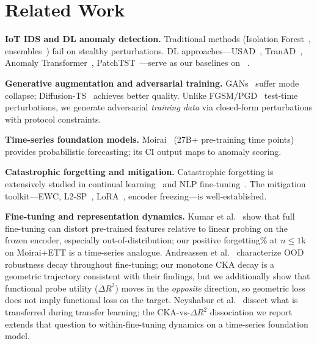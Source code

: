 \section{Related Work}
\label{sec:related}

\textbf{IoT IDS and DL anomaly detection.}
Traditional methods (Isolation Forest~\cite{liu2012isolation},
ensembles~\cite{garcia2014empirical}) fail on stealthy perturbations.
DL approaches---USAD~\cite{audibert2020usad},
TranAD~\cite{tuli2022tranad}, Anomaly
Transformer~\cite{xu2022anomaly}, PatchTST~\cite{nie2023patchtst}---serve
as our baselines on \dataset{}~\cite{neto2023ciciot}.

\textbf{Generative augmentation and adversarial training.}
GANs~\cite{lin2022idsgan} suffer mode collapse;
Diffusion-TS~\cite{zhang2024diffusionts} achieves better quality.
Unlike FGSM/PGD~\cite{goodfellow2015adversarial, madry2018pgd}
test-time perturbations, we generate adversarial \emph{training data}
via closed-form perturbations with protocol constraints.

\textbf{Time-series foundation models.}
Moirai~\cite{woo2024moirai} (27B+ pre-training time points) provides
probabilistic forecasting; its CI output maps to anomaly scoring.

\textbf{Catastrophic forgetting and mitigation.}
Catastrophic forgetting is extensively studied in continual
learning~\cite{kirkpatrick2017ewc, li2017lwf} and NLP fine-tuning~\cite{luo2024forgetting}.
The mitigation toolkit---EWC, L2-SP~\cite{li2018l2sp},
LoRA~\cite{hu2022lora}, encoder freezing---is well-established.

\textbf{Fine-tuning and representation dynamics.}
Kumar et al.~\cite{kumar2022finetuning} show that full fine-tuning can
distort pre-trained features relative to linear probing on the frozen
encoder, especially out-of-distribution; our positive forgetting\% at
$n{\leq}1$k on Moirai+ETT is a time-series analogue.
Andreassen et al.~\cite{andreassen2023evolution} characterize OOD
robustness decay throughout fine-tuning; our monotone CKA decay is a
geometric trajectory consistent with their findings, but we additionally
show that functional probe utility ($\Delta R^2$) moves in the
\emph{opposite} direction, so geometric loss does not imply functional
loss on the target.
Neyshabur et al.~\cite{neyshabur2020transferred} dissect what is
transferred during transfer learning; the CKA-vs-$\Delta R^2$
dissociation we report extends that question to within-fine-tuning
dynamics on a time-series foundation model.

